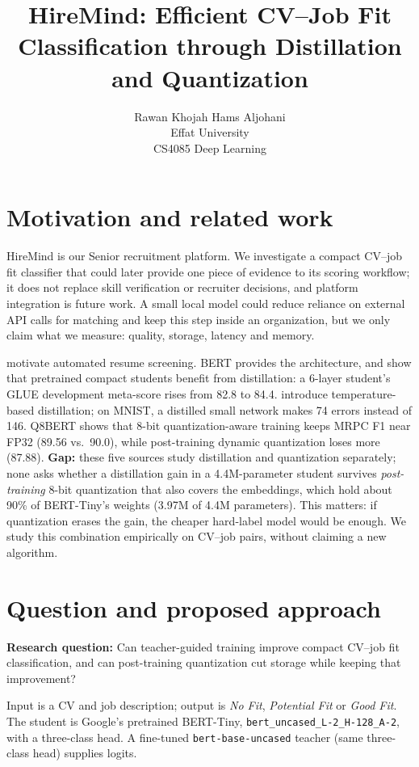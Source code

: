 \documentclass[11pt]{article}
\title{HireMind: Efficient CV--Job Fit Classification through Distillation and Quantization}
\author{Rawan Khojah \quad Hams Aljohani\\Effat University\\CS4085 Deep Learning}
\begin{document}
\maketitle
\section{Motivation and related work}
HireMind is our Senior recruitment platform. We investigate a compact CV--job fit classifier that could later provide one piece of evidence to its scoring workflow; it does not replace skill verification or recruiter decisions, and platform integration is future work. A small local model could reduce reliance on external API calls for matching and keep this step inside an organization, but we only claim what we measure: quality, storage, latency and memory.

\citet{gan} motivate automated resume screening. BERT \citep{bert} provides the architecture, and \citet{turc} show that pretrained compact students benefit from distillation: a 6-layer student's GLUE development meta-score rises from 82.8 to 84.4. \citet{hinton} introduce temperature-based distillation; on MNIST, a distilled small network makes 74 errors instead of 146. Q8BERT \citep{q8} shows that 8-bit quantization-aware training keeps MRPC F1 near FP32 (89.56 vs.\ 90.0), while post-training dynamic quantization loses more (87.88). \textbf{Gap:} these five sources study distillation and quantization separately; none asks whether a distillation gain in a 4.4M-parameter student survives \emph{post-training} 8-bit quantization that also covers the embeddings, which hold about 90\% of BERT-Tiny's weights (3.97M of 4.4M parameters). This matters: if quantization erases the gain, the cheaper hard-label model would be enough. We study this combination empirically on CV--job pairs, without claiming a new algorithm.

\section{Question and proposed approach}
\textbf{Research question:} Can teacher-guided training improve compact CV--job fit classification, and can post-training quantization cut storage while keeping that improvement?

Input is a CV and job description; output is \emph{No Fit}, \emph{Potential Fit} or \emph{Good Fit}. The student is Google's pretrained BERT-Tiny, \texttt{bert\_uncased\_L-2\_H-128\_A-2}, with a three-class head. A fine-tuned \texttt{bert-base-uncased} teacher (same three-class head) supplies logits.
\end{document}
